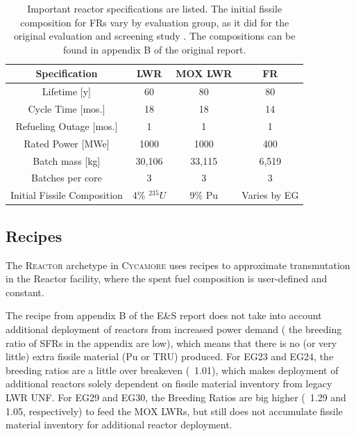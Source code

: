 \documentclass{article}
\newcommand{\Cycamore}{\textsc{Cycamore}\xspace}%
\begin{document}
\begin{table}[h]
    \centering
    \begin{tabular}{cccc}
        \hline
        \textbf{Specification} & LWR & MOX LWR & FR\\
        \hline
                Lifetime [y] & 60 & 80 & 80 \\
                Cycle Time [mos.]& 18 & 18 & 14\\ 
                Refueling Outage [mos.]& 1 & 1  & 1\\
                Rated Power [MWe] & 1000 & 1000 & 400\\
                Batch mass [kg] & 30,106 & 33,115 & 6,519 \\
                Batches per core & 3 & 3 & 3\\
                Initial Fissile Composition & 4\% $^{235}U$ & 9\% Pu & Varies by EG \\
        \hline
    \end{tabular}
        \caption {Important reactor specifications are listed. The initial fissile composition
        		 for FRs vary by evaluation group, as it did for the original evaluation and screening
        		  study \cite{wigeland_nuclear_2014}. The compositions can be found in appendix B of the
        		  original report.}
    \label{tab:react}

    \end{table}

\subsection{Recipes}
The \textsc{Reactor}\xspace archetype in \Cycamore uses recipes to approximate
transmutation in the Reactor facility,
where the spent fuel composition is user-defined and constant. 

The recipe from appendix B of the E\&S report does not take into account
additional deployment of reactors from increased power demand ( the breeding ratio
of \glspl{SFR} in the appendix are low), which means that there is no (or very little)
extra fissile material (Pu or TRU) produced. For EG23 and EG24, the breeding ratios are
a little over breakeven (~1.01), which makes deployment of additional reactors solely 
dependent on fissile material inventory from legacy LWR \gls{UNF}. For EG29 and EG30,
the Breeding Ratios are big higher (~1.29 and 1.05, respectively) to feed the
\gls{MOX} \glspl{LWR}, but still does not accumulate fissile material inventory for
additional reactor deployment.
\end{document}

